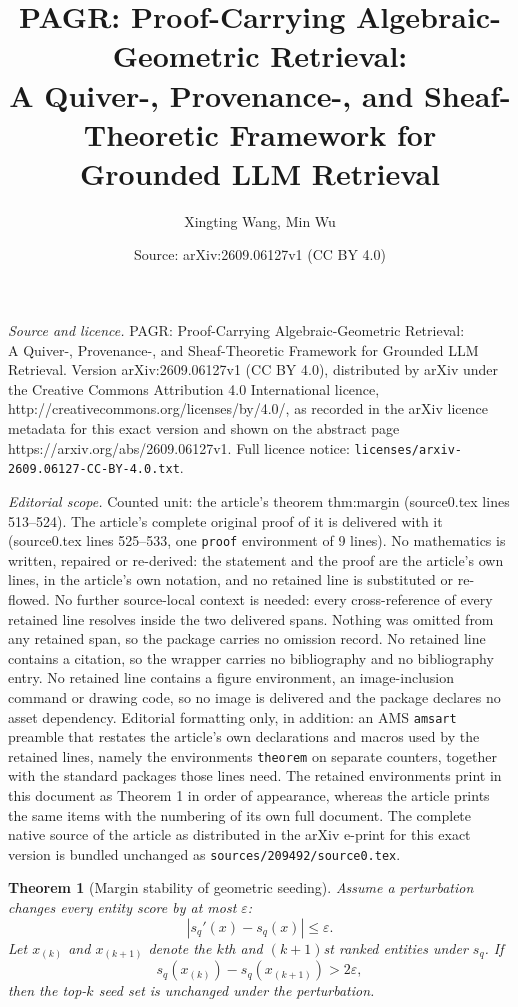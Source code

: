 \documentclass[10pt,a4paper]{amsart}
\title{PAGR: Proof-Carrying Algebraic-Geometric Retrieval:\\ A Quiver-, Provenance-, and Sheaf-Theoretic Framework for Grounded LLM Retrieval}
\author{Xingting Wang, Min Wu}
\date{Source: arXiv:2609.06127v1 (CC BY 4.0)}
\newtheorem{theorem}{Theorem}
\begin{document}
\maketitle

\noindent\emph{Source and licence.} PAGR: Proof-Carrying Algebraic-Geometric Retrieval:\\ A Quiver-, Provenance-, and Sheaf-Theoretic Framework for Grounded LLM Retrieval. Version arXiv:2609.06127v1 (CC BY 4.0), distributed by arXiv under the Creative Commons Attribution 4.0 International licence, http://creativecommons.org/licenses/by/4.0/, as recorded in the arXiv licence metadata for this exact version and shown on the abstract page https://arxiv.org/abs/2609.06127v1. Full licence notice: \texttt{licenses/arxiv-2609.06127-CC-BY-4.0.txt}.\par\smallskip

\noindent\textit{Editorial scope.} Counted unit: the article's theorem thm:margin (source0.tex lines 513--524). The article's complete original proof of it is delivered with it (source0.tex lines 525--533, one \texttt{proof} environment of 9 lines). No mathematics is written, repaired or re-derived: the statement and the proof are the article's own lines, in the article's own notation, and no retained line is substituted or re-flowed.  No further source-local context is needed: every cross-reference of every retained line resolves inside the two delivered spans.  Nothing was omitted from any retained span, so the package carries no omission record.  No retained line contains a citation, so the wrapper carries no bibliography and no bibliography entry.  No retained line contains a figure environment, an image-inclusion command or drawing code, so no image is delivered and the package declares no asset dependency.  Editorial formatting only, in addition: an AMS \texttt{amsart} preamble that restates the article's own declarations and macros used by the retained lines, namely the environments \texttt{theorem} on separate counters, together with the standard packages those lines need.  The retained environments print in this document as Theorem 1 in order of appearance, whereas the article prints the same items with the numbering of its own full document.  The complete native source of the article as distributed in the arXiv e-print for this exact version is bundled unchanged as \texttt{sources/209492/source0.tex}.
\begin{theorem}[Margin stability of geometric seeding]
\label{thm:margin}
Assume a perturbation changes every entity score by at most $\varepsilon$:
\[
|s_q'(x)-s_q(x)|\le \varepsilon.
\]
Let $x_{(k)}$ and $x_{(k+1)}$ denote the $k$th and $(k+1)$st ranked entities under $s_q$. If
\[
s_q(x_{(k)})-s_q(x_{(k+1)})>2\varepsilon,
\]
then the top-$k$ seed set is unchanged under the perturbation.
\end{theorem}
\end{document}
